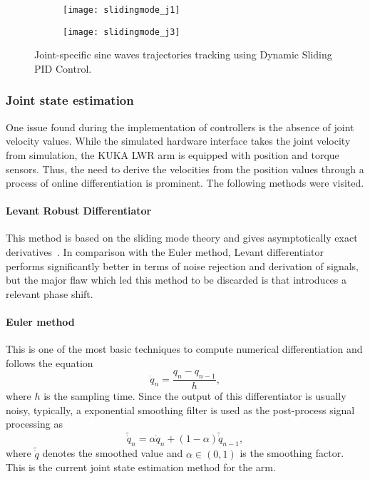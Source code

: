 \begin{figure}[H]
	\centering
	\begin{subfigure}[t]{0.9\textwidth}
		\centering
		\texttt{[image: slidingmode\_j1]}
	\end{subfigure}
	\begin{subfigure}[t]{0.9\textwidth}
		\centering
		\texttt{[image: slidingmode\_j3]}
	\end{subfigure}
	\caption{Joint-specific sine waves trajectories tracking using Dynamic Sliding PID Control.}
\end{figure}

\subsubsection{Joint state estimation}

One issue found during the implementation of controllers is the absence of joint velocity values. While the simulated hardware interface takes the joint velocity from simulation, the KUKA LWR arm is equipped with position and torque sensors. Thus, the need to derive the velocities from the position values through a process of online differentiation is prominent. The following methods were visited.

\paragraph{Levant Robust Differentiator}
This method is based on the sliding mode theory and gives asymptotically exact derivatives~\cite{levant06}. In comparison with the Euler method, Levant differentiator performs significantly better in terms of noise rejection and derivation of signals, but the major flaw which led this method to be discarded is that introduces a relevant phase shift. 
\paragraph{Euler method}
This is one of the most basic techniques to compute numerical differentiation and follows the equation
\begin{equation}
\dot{q}_n = \frac{q_n - q_{n-1}}{h},
\end{equation}
where $h$ is the sampling time. Since the output of this differentiator is usually noisy, typically, a exponential smoothing filter is used as the post-process signal processing as
\begin{equation}
\tilde{\dot{q}}_n = \alpha\dot{q}_n + (1-\alpha)\tilde{\dot{q}}_{n-1},
\end{equation}
where $\tilde{\dot{q}}$ denotes the smoothed value and $\alpha\in(0,1)$ is the smoothing factor. This is the current joint state estimation method for the arm.

